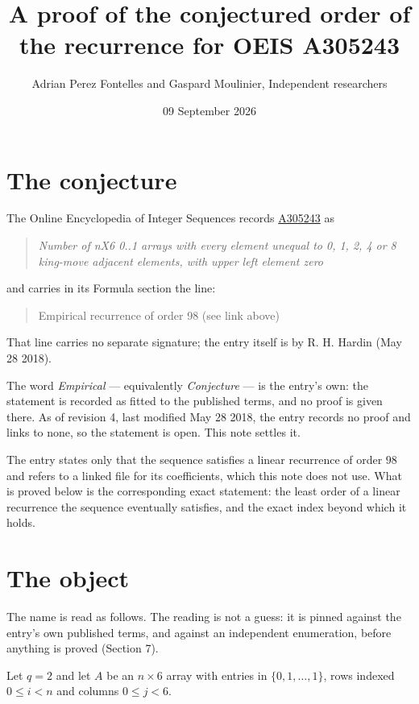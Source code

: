 \documentclass[11pt]{article}
\title{A proof of the conjectured order of the recurrence for OEIS A305243}
\author{Adrian Perez Fontelles and Gaspard Moulinier, Independent researchers}
\date{09 September 2026}
\theoremstyle{definition}
\begin{document}
\maketitle
\section{The conjecture}

The Online Encyclopedia of Integer Sequences records \href{https://oeis.org/A305243}{A305243} as

\begin{quote}\itshape Number of nX6 0..1 arrays with every element unequal to 0, 1, 2, 4 or 8 king-move adjacent elements, with upper left element zero\end{quote}

and carries in its Formula section the line:

\begin{quote}\ttfamily Empirical recurrence of order 98 (see link above)\end{quote}

That line carries no separate signature; the entry itself is by R. H. Hardin (May 28 2018).

The word {\itshape Empirical} --- equivalently {\itshape Conjecture} --- is the entry's own: the statement is recorded as fitted to the published terms, and no proof is given there. As of revision 4, last modified May 28 2018, the entry records no proof and links to none, so the statement is open. This note settles it.

The entry states only that the sequence satisfies a linear recurrence of order $98$ and refers to a linked file for its coefficients, which this note does not use. What is proved below is the corresponding exact statement: the least order of a linear recurrence the sequence eventually satisfies, and the exact index beyond which it holds.

\section{The object}

The name is read as follows. The reading is not a guess: it is pinned against the entry's own published terms, and against an independent enumeration, before anything is proved (Section 7).

Let $q = 2$ and let $A$ be an $n \times 6$ array with entries in $\{0,1,\dots,1\}$, rows indexed $0 \le i < n$ and columns $0 \le j < 6$.
\end{document}
